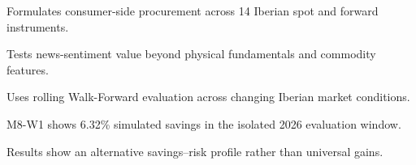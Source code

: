 \begin{highlights}
\item Formulates consumer-side procurement across 14 Iberian spot and forward instruments.
\item Tests news-sentiment value beyond physical fundamentals and commodity features.
\item Uses rolling Walk-Forward evaluation across changing Iberian market conditions.
\item M8-W1 shows 6.32\% simulated savings in the isolated 2026 evaluation window.
\item Results show an alternative savings--risk profile rather than universal gains.
\end{highlights}
